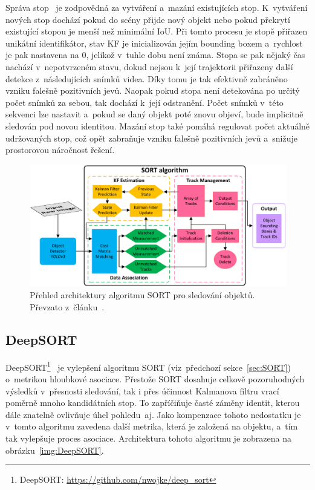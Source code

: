 Správa stop~\cite{article:SORT, website:Tracking} je zodpovědná za vytváření a~mazání existujících stop. K~vytváření nových stop dochází pokud do scény přijde nový objekt nebo pokud překrytí existující stopou je menší než minimální IoU. Při tomto procesu je stopě přiřazen unikátní identifikátor, stav KF je inicializován jejím bounding boxem a~rychlost je pak nastavena na $0$, jelikož v~tuhle dobu není známa. Stopa se pak nějaký čas nachází v~nepotvrzeném stavu, dokud nejsou k~její trajektorii přiřazeny další detekce z~následujících snímků videa. Díky tomu je tak efektivně zabráněno vzniku falešně pozitivních jevů. Naopak pokud stopa není detekována po určitý počet snímků za sebou, tak dochází k~její odstranění. Počet snímků v~této sekvenci lze nastavit a~pokud se daný objekt poté znovu objeví, bude implicitně sledován pod novou identitou. Mazání stop také pomáhá regulovat počet aktuálně udržovaných stop, což opět zabraňuje vzniku falešně pozitivních jevů a~snižuje prostorovou náročnost řešení.

\begin{figure}[hbt]
	\centering
	\setlength{\fboxsep}{0pt}
	\includegraphics[width=1.0\textwidth]{obrazky-figures/SORT.pdf}
	\caption{Přehled architektury algoritmu SORT pro sledování objektů. Převzato z~článku~\cite{article:Tracking}.}
	\label{img:SORT}
\end{figure}

\subsection{DeepSORT}
\label{sec:DeepSORT}
DeepSORT\footnote{DeepSORT: \url{https://github.com/nwojke/deep_sort}}~\cite{website:Tracking} je vylepšení algoritmu SORT (viz~předchozí sekce~\ref{sec:SORT}) o~metrikou hloubkové asociace. Přestože SORT dosahuje celkově pozoruhodných výsledků v~přesnosti sledování, tak i přes účinnost Kalmanova filtru vrací poměrně mnoho kandidátních stop. To zapříčiňuje časté záměny identit, kterou dále znatelně ovlivňuje úhel pohledu~aj. Jako kompenzace tohoto nedostatku je v~tomto algoritmu zavedena další metrika, která je založená na  objektu, a~tím tak vylepšuje proces asociace. Architektura tohoto algoritmu je zobrazena na obrázku~\ref{img:DeepSORT}.

